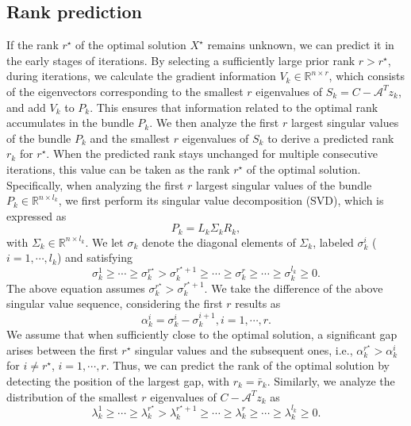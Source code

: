 \documentclass{jcmlatex}
\begin{document}
\subsection{Rank prediction}
If the rank \( r^{\star} \) of the optimal solution \( X^{\star} \) remains unknown, we can predict it in the early stages of iterations. By selecting a sufficiently large prior rank \( r > r^{\star} \), during iterations, we calculate the gradient information \( V_{k} \in \mathbb{R}^{n \times r} \), which consists of the eigenvectors corresponding to the smallest \( r \) eigenvalues of \( S_{k} = C - \mathcal{A}^{T}z_{k} \), and add \( V_{k} \) to \( P_{k} \). This ensures that information related to the optimal rank accumulates in the bundle \( P_{k} \). We then analyze the first \( r \) largest singular values of the bundle \( P_{k} \) and the smallest \( r \) eigenvalues of \( S_{k} \) to derive a predicted rank \( r_{k} \) for \( r^{\star} \). When the predicted rank stays unchanged for multiple consecutive iterations, this value can be taken as the rank \( r^{\star} \) of the optimal solution. Specifically, when analyzing the first \( r \) largest singular values of the bundle \( P_{k} \in \mathbb{R}^{n \times l_{k}} \), we first perform its singular value decomposition (SVD), which is expressed as 
\begin{equation*}
P_{k}=L_{k}\Sigma_{k}R_{k},
\end{equation*}  
with \(\Sigma_{k}\in\mathbb{R}^{n\times l_{k}}\). We let \(\sigma_{k}\) denote the diagonal elements of \(\Sigma_{k}\), labeled \(\sigma_{k}^{i}\) (\(i = 1, \cdots, l_{k}\)) and satisfying  
\begin{equation*}
\sigma_{k}^{1}\geq\cdots\geq\sigma_{k}^{r^{\star}}>\sigma_{k}^{r^{\star}+1} \geq\cdots\geq\sigma_{k}^{r}\geq \cdots\geq \sigma_{k}^{l_{k}}\geq0.
\end{equation*}  
The above equation assumes \(\sigma_{k}^{r^{\star}} > \sigma_{k}^{r^{\star}+1}\). We take the difference of the above singular value sequence, considering the first \(r\) results as  
\begin{equation*}
\alpha_{k}^{i}=\sigma_{k}^{i}-\sigma_{k}^{i+1},i=1,\cdots,r.
\end{equation*}  
We assume that when sufficiently close to the optimal solution, a significant gap arises between the first \(r^{\star}\) singular values and the subsequent ones, i.e., \(\alpha_{k}^{r^{\star}} > \alpha_{k}^{i}\) for \(i \neq r^{\star}\), \(i = 1, \cdots, r\). Thus, we can predict the rank of the optimal solution by detecting the position of the largest gap, with \(r_{k} = \bar{r}_{k}\). Similarly, we analyze the distribution of the smallest \(r\) eigenvalues of \(C-\mathcal{A}^{T}z_{k}\) as  
\begin{equation*}
\lambda_{k}^{1}\geq\cdots\geq\lambda_{k}^{r^{\star}}>\lambda_{k}^{r^{\star}+1} \geq\cdots\geq\lambda_{k}^{r}\geq \cdots\geq \lambda_{k}^{l_{k}}\geq0.
\end{equation*}
\end{document}
